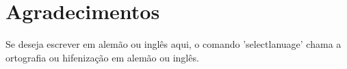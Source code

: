 \clearpage
\chapter*{\textbf{Agradecimentos}}\label{Agradecimentos}

Se deseja escrever em alemão ou inglês aqui, o comando 'selectlanuage' chama a ortografia ou hifenização em alemão ou inglês.


